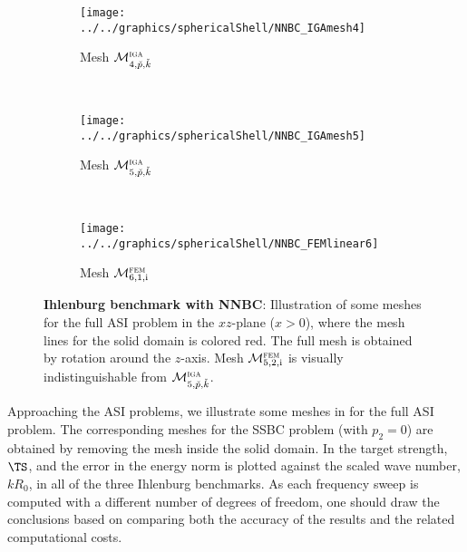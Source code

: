 \begin{figure}
	\centering
	\begin{subfigure}{0.3\textwidth}
		\centering
		\texttt{[image: ../../graphics/sphericalShell/NNBC\_IGAmesh4]}
		\caption{Mesh ${\cal M}_{4,\check{p},\check{k}}^{\textsc{iga}}$}
		\label{Fig2:SphericalShellMeshes1NNBC}
    \end{subfigure}
    ~
	\begin{subfigure}{0.3\textwidth}
		\centering
		\texttt{[image: ../../graphics/sphericalShell/NNBC\_IGAmesh5]}
		\caption{Mesh ${\cal M}_{5,\check{p},\check{k}}^{\textsc{iga}}$}
		\label{Fig2:SphericalShellMeshes2NNBC}
    \end{subfigure}
    ~
	\begin{subfigure}{0.3\textwidth}
		\centering
		\texttt{[image: ../../graphics/sphericalShell/NNBC\_FEMlinear6]}
		\caption{Mesh ${\cal M}_{6,1,\mathrm{i}}^{\textsc{fem}}$}
		\label{Fig2:SphericalShellMeshes3NNBC}
    \end{subfigure}
	\caption{\textbf{Ihlenburg benchmark with NNBC}: Illustration of some meshes for the full ASI problem in the $xz$-plane ($x>0$), where the mesh lines for the solid domain is colored red. The full mesh is obtained by rotation around the $z$-axis. Mesh ${\cal M}_{5,2,\mathrm{i}}^{\textsc{fem}}$ is visually indistinguishable from ${\cal M}_{5,\check{p},\check{k}}^{\textsc{iga}}$.}
	\label{Fig2:SphericalShellMeshesNNBC}
\end{figure}
Approaching the ASI problems, we illustrate some meshes in  for the full ASI problem. The corresponding meshes for the SSBC problem (with $p_2=0$) are obtained by removing the mesh inside the solid domain. In  the target strength, $\TS$, and the error in the energy norm is plotted against the scaled wave number, $kR_0$, in all of the three Ihlenburg benchmarks. As each frequency sweep is computed with a different number of degrees of freedom, one should draw the conclusions based on comparing both the accuracy of the results and the related computational costs.

